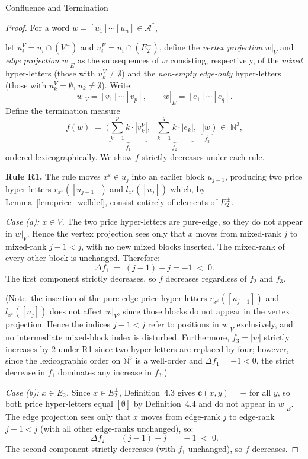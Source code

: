 \documentclass{article}
\theoremstyle{definition}
\theoremstyle{remark}
\theoremstyle{theorem}
\theoremstyle{definition}
\begin{document}
\begin{section}{Confluence and Termination}
\begin{proof}
For a word $w = [u_1]\cdots[u_n] \in \mathcal{A}^*$, 

let $u_i^V = u_i \cap (V^{\pm})$ and $u_i^E = u_i \cap (E_2^{\pm})$, define the
\emph{vertex projection} $w|_V$ and \emph{edge projection} $w|_E$ as
the subsequences of $w$ consisting, respectively, of the
\emph{mixed} hyper-letters (those with $u_k^V \neq \emptyset$) and the
\emph{non-empty edge-only} hyper-letters (those with $u_k^V = \emptyset$,
$u_k \neq \emptyset$). Write:
\[
  w|_V = [v_1]\cdots[v_p], \qquad w|_E = [e_1]\cdots[e_q].
\]
Define the termination measure
\[
  f(w) \;=\;
  \Biggl(
    \underbrace{\sum_{k=1}^{p} k \cdot |v_k^V|}_{f_1},\;\;
    \underbrace{\sum_{k=1}^{q} k \cdot |e_k|}_{f_2},\;\;
    \underbrace{|w|}_{f_3}
  \Biggr)
  \;\in\; \mathbb{N}^3,
\]
ordered lexicographically. We show $f$ strictly decreases under each rule.

\medskip
\noindent\textbf{Rule R1.}
The rule moves $x^\varepsilon \in u_j$ into an earlier block $u_{j-1}$,
producing two price hyper-letters $r_{x^\varepsilon}([u_{j-1}])$ and
$l_{x^\varepsilon}([u_j])$ which, by Lemma~\ref{lem:price_welldef}, consist entirely of
elements of $E_2^\pm$.

\smallskip
\noindent\emph{Case (a): $x \in V$.}
The two price hyper-letters are pure-edge, so they do not appear in
$w|_V$. Hence the vertex projection sees only that $x$ moves from
mixed-rank $j$ to mixed-rank $j-1 < j$, with no new mixed blocks inserted.
The mixed-rank of every other block is unchanged. Therefore:
\[
  \Delta f_1 \;=\;  (j-1)-j = -1 \;<\; 0.
\]
The first component strictly decreases, so $f$ decreases regardless of
$f_2$ and $f_3$.

(Note: the insertion of the pure-edge price hyper-letters
$r_{x^\varepsilon}([u_{j-1}])$ and $l_{x^\varepsilon}([u_j])$ does not affect
$w|_V$, since those blocks do not appear in the vertex projection. Hence
the indices $j-1 < j$ refer to positions in $w|_V$ exclusively, and no
intermediate mixed-block index is disturbed. Furthermore, $f_3 = |w|$
strictly increases by $2$ under R1 since two hyper-letters are replaced by
four; however, since the lexicographic order on $\mathbb{N}^3$ is a
well-order and $\Delta f_1 = -1 < 0$, the strict decrease in $f_1$
dominates any increase in $f_3$.)

\smallskip
\noindent\emph{Case (b): $x \in E_2$.}
Since $x \in E_2^\pm$, Definition~4.3 gives $\mathbf{c}(x,y) = -$ for all $y$,
so both price hyper-letters equal $[\emptyset]$ by Definition~4.4 and do not appear in $w|_E$.
The edge projection sees only that $x$ moves from edge-rank $j$ to
edge-rank $j-1 < j$ (with all other edge-ranks unchanged), so:
\[
  \Delta f_2 \;=\; (j-1)-j \;=\; -1 \;<\; 0.
\]
The second component strictly decreases (with $f_1$ unchanged), so $f$
decreases.


\end{proof}
\end{section}
\end{document}
